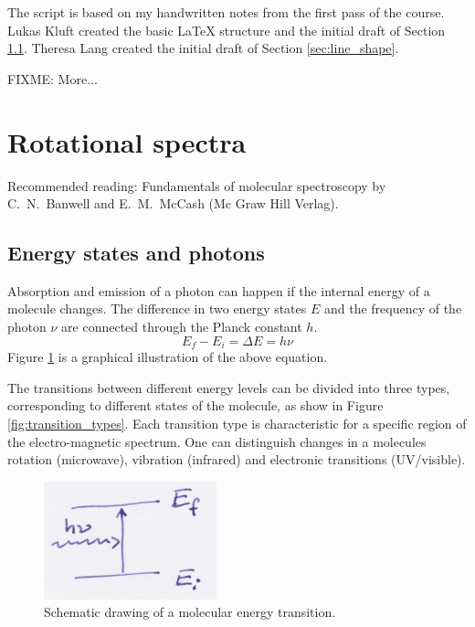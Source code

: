 The script is based on my handwritten notes from the first pass of the
course.  Lukas Kluft created the basic LaTeX structure and the initial
draft of Section \ref{sec:energy-states}. Theresa Lang created the
initial draft of Section \ref{sec:line_shape}.

FIXME: More...

\section{Rotational spectra}
\label{sec:rotational_spectra}

Recommended reading: Fundamentals of molecular spectroscopy by C.\ N.\
Banwell and E.\ M.\ McCash (Mc Graw Hill Verlag).

\subsection{Energy states and photons}
\label{sec:energy-states}
Absorption and emission of a photon can happen if the internal energy of a
molecule changes. The difference in two energy states $E$ and the frequency of
the photon $\nu$ are connected through the Planck constant $h$.
\begin{equation}
  E_f - E_i = \Delta E = h \nu
\end{equation}
Figure \ref{fig:schematic_energies} is a graphical illustration of the
above equation.

The transitions between different energy levels can be divided into
three types, corresponding to different states of the molecule, as
show in Figure \ref{fig:transition_types}.  Each transition type is
characteristic for a specific region of the electro-magnetic spectrum.
One can distinguish changes in a molecules rotation (microwave),
vibration (infrared) and electronic transitions (UV/visible).

\begin{figure}
  \centering
  \includegraphics[width=5cm]{figures/schematic_energy_states}
  \caption{Schematic drawing of a molecular energy transition.}
  \label{fig:schematic_energies}
\end{figure}


